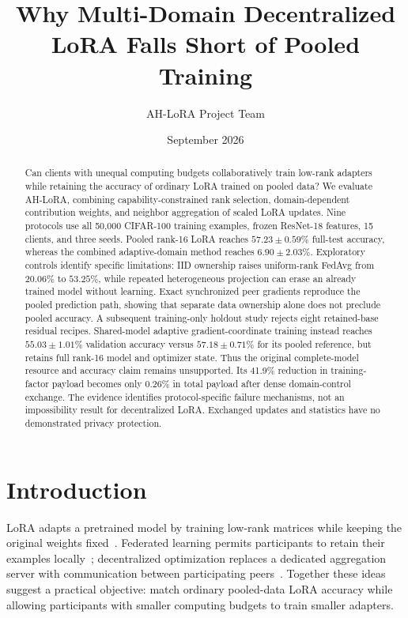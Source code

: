 \documentclass[11pt]{article}
\title{Why Multi-Domain Decentralized LoRA Falls Short of Pooled Training}
\author{AH-LoRA Project Team}
\date{September 2026}
\begin{document}
\maketitle
\begin{abstract}
Can clients with unequal computing budgets collaboratively train low-rank adapters while retaining the accuracy of ordinary LoRA trained on pooled data? We evaluate AH-LoRA, combining capability-constrained rank selection, domain-dependent contribution weights, and neighbor aggregation of scaled LoRA updates. Nine protocols use all 50,000 CIFAR-100 training examples, frozen ResNet-18 features, 15 clients, and three seeds. Pooled rank-16 LoRA reaches $57.23\pm0.59\%$ full-test accuracy, whereas the combined adaptive-domain method reaches $6.90\pm2.03\%$. Exploratory controls identify specific limitations: IID ownership raises uniform-rank FedAvg from $20.06\%$ to $53.25\%$, while repeated heterogeneous projection can erase an already trained model without learning. Exact synchronized peer gradients reproduce the pooled prediction path, showing that separate data ownership alone does not preclude pooled accuracy. A subsequent training-only holdout study rejects eight retained-base residual recipes. Shared-model adaptive gradient-coordinate training instead reaches $55.03\pm1.01\%$ validation accuracy versus $57.18\pm0.71\%$ for its pooled reference, but retains full rank-16 model and optimizer state. Thus the original complete-model resource and accuracy claim remains unsupported. Its 41.9\% reduction in training-factor payload becomes only 0.26\% in total payload after dense domain-control exchange. The evidence identifies protocol-specific failure mechanisms, not an impossibility result for decentralized LoRA. Exchanged updates and statistics have no demonstrated privacy protection.
\end{abstract}

\section{Introduction}
LoRA adapts a pretrained model by training low-rank matrices while keeping the original weights fixed~\citep{hu2022lora}. Federated learning permits participants to retain their examples locally~\citep{mcmahan2017fedavg}; decentralized optimization replaces a dedicated aggregation server with communication between participating peers~\citep{boyd2006gossip,lian2017dpsgd}. Together these ideas suggest a practical objective: match ordinary pooled-data LoRA accuracy while allowing participants with smaller computing budgets to train smaller adapters.
\end{document}
